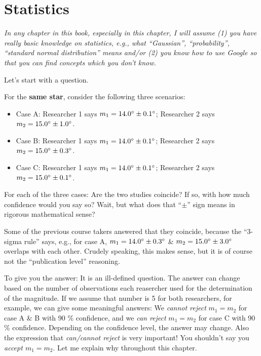 \chapter{Statistics}

\textit{In any chapter in this book, especially in this chapter, I will assume (1) you have really basic knowledge on statistics, e.g., what ``Gaussian'', ``probability'', ``standard normal distribution'' means and/or (2) you know how to use Google so that you can find concepts which you don't know.}

Let's start with a question. 
\begin{ex}
  For the \textbf{same star}, consider the following three scenarios:
  \begin{itemize}
    \item Case A: Researcher 1 says $ m_1 =  \m{14.0} \pm \m{0.1} $; Researcher 2 says $ m_2 = \m{15.0} \pm \m{1.0} $.
    \item Case B: Researcher 1 says $ m_1 =  \m{14.0} \pm \m{0.1} $; Researcher 2 says $ m_2 = \m{15.0} \pm \m{0.3} $.
    \item Case C: Researcher 1 says $ m_1 =  \m{14.0} \pm \m{0.1} $; Researcher 2 says $ m_2 = \m{15.0} \pm \m{0.1} $.
  \end{itemize}
  For each of the three cases: Are the two studies coincide? If so, with how much confidence would you say so? Wait, but what does that ``$ \pm $'' sign means in rigorous mathematical sense?
\end{ex}

Some of the previous course takers answered that they coincide, because the ``3-sigma rule'' says, e.g., for case A, $ m_1 = \m{14.0} \pm \m{0.3} $ \& $ m_2 = \m{15.0} \pm \m{3.0} $ overlaps with each other. Crudely speaking, this makes sense, but it is of course not the ``publication level'' reasoning.

To give you the answer: It is an ill-defined question. The answer can change based on the number of observations each reasercher used for the determination of the magnitude. If we assume that number is 5 for both researchers, for example, we can give some meaningful answers: We \textit{cannot reject} $ m_1 = m_2 $ for case A \& B with 90 \% confidence, and we \textit{can reject} $ m_1 = m_2 $ for case C with 90 \% confidence. Depending on the confidence level, the answer may change. Also the expression that \textit{can/cannot reject} is very important! You shouldn't say you \textit{accept $ m_1 = m_2 $}. Let me explain why throughout this chapter.


